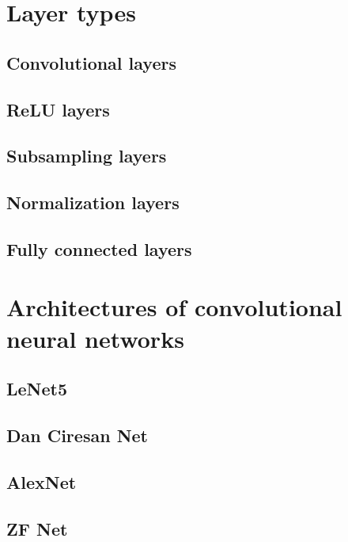 \section{Layer types}
\label{layers}



\subsection{Convolutional layers}
\label{conv-layers}

\subsection{ReLU layers}
\label{relu-layers}

\subsection{Subsampling layers}
\label{subsampling}

\subsection{Normalization layers}
\label{norm-layers}

\subsection{Fully connected layers}
\label{fc-layers}

\section{Architectures of convolutional neural networks}
\label{cnn-architectures}

\subsection{LeNet5} %
\label{lenet}

\subsection{Dan Ciresan Net}
\label{ciresan}

\subsection{AlexNet} %
\label{alexnet}

\subsection{ZF Net}
\label{zfnet}

